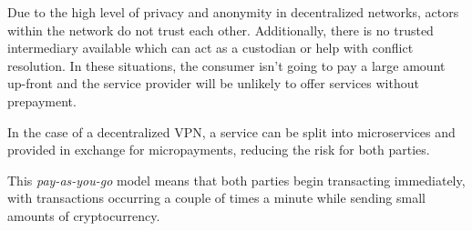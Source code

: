 \documentclass[a4paper,12pt]{article}
\begin{document}
Due to the high level of privacy and anonymity in decentralized networks, actors 
within the network do not trust each other. Additionally, there is no trusted 
intermediary available which can act as a custodian or help with conflict 
resolution. In these situations, the consumer isn’t going to pay a large amount 
up-front and the service provider will be unlikely to offer services without 
prepayment.

In the case of a decentralized VPN, a service can be split into microservices and 
provided in exchange for micropayments, reducing the risk for both parties.

This \textit{pay-as-you-go} model means that both parties begin transacting 
immediately, with transactions occurring a couple of times a minute while 
sending small amounts of cryptocurrency.
\end{document}
